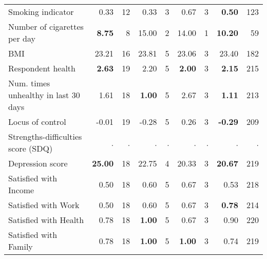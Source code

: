 \begin{tabular}{l r r r r r r r r}
Smoking indicator &      0.33 &        12 &      0.33 &         3 &      0.67 &         3 & \textbf{     0.50} &       123 \\
Number of cigarettes per day & \textbf{     8.75} &         8 &     15.00 &         2 &     14.00 &         1 & \textbf{    10.20} &        59 \\
BMI &     23.21 &        16 &     23.81 &         5 &     23.06 &         3 &     23.40 &       182 \\
Respondent health & \textbf{     2.63} &        19 &      2.20 &         5 & \textbf{     2.00} &         3 & \textbf{     2.15} &       215 \\
Num. times unhealthy in last 30 days &      1.61 &        18 & \textbf{     1.00} &         5 &      2.67 &         3 & \textbf{     1.11} &       213 \\
Locus of control &     -0.01 &        19 &     -0.28 &         5 &      0.26 &         3 & \textbf{    -0.29} &       209 \\
Strengths-difficulties score (SDQ) &         . & . &         . & . &         . & . &         . & . \\
Depression score & \textbf{    25.00} &        18 &     22.75 &         4 &     20.33 &         3 & \textbf{    20.67} &       219 \\
Satisfied with Income &      0.50 &        18 &      0.60 &         5 &      0.67 &         3 &      0.53 &       218 \\
Satisfied with Work &      0.50 &        18 &      0.60 &         5 &      0.67 &         3 & \textbf{     0.78} &       214 \\
Satisfied with Health &      0.78 &        18 & \textbf{     1.00} &         5 &      0.67 &         3 &      0.90 &       220 \\
Satisfied with Family &      0.78 &        18 & \textbf{     1.00} &         5 & \textbf{     1.00} &         3 &      0.74 &       219 \\
\bottomrule
\end{tabular}
